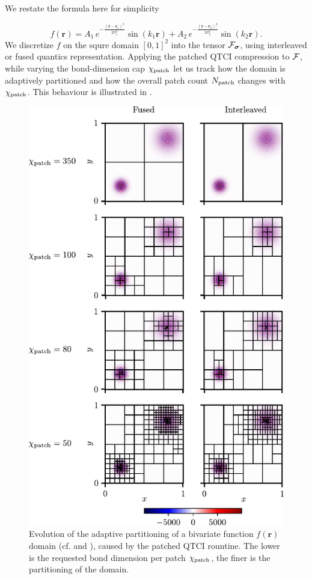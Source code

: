We restate the formula here for simplicity

\begin{equation*}
		f(\boldsymbol{r}) = A_1\,e^{-\frac{(\boldsymbol{r} - \boldsymbol{r}_1)^2}{2\sigma^2_1}} \sin(k_1\boldsymbol{r}) + A_2\,e^{-\frac{(\boldsymbol{r} - \boldsymbol{r}_2)^2}{2\sigma^2_2}} \sin(k_2\boldsymbol{r}). 
\end{equation*}
We discretize $f$ on the squre domain $[0,1]^2$ into the tensor $\mathcal{F}_{\boldsymbol{\sigma}}$, using interleaved or fused quantics representation. Applying the patched QTCI compression to $\mathcal{F}$, while varying the bond-dimension cap $\chi_{\text{patch}}$ let us track how the domain is adaptively partitioned and how the overall patch count $N_{\text{patch}}$ changes with $\chi_{\text{patch}}$. This behaviour is illustrated in . 

\begin{figure}[ht!]
	\includegraphics{figures/PatchEvolutionwithChi.pdf}
	\caption{Evolution of the adaptive partitioning of a bivariate function $f(\boldsymbol{r})$ domain (cf.  and ), caused by the patched QTCI rountine. The lower is the requested bond dimension per patch $\chi_{\text{patch}}$, the finer is the partitioning of the domain. }
	\label{fig:patchEvolution}
\end{figure}

